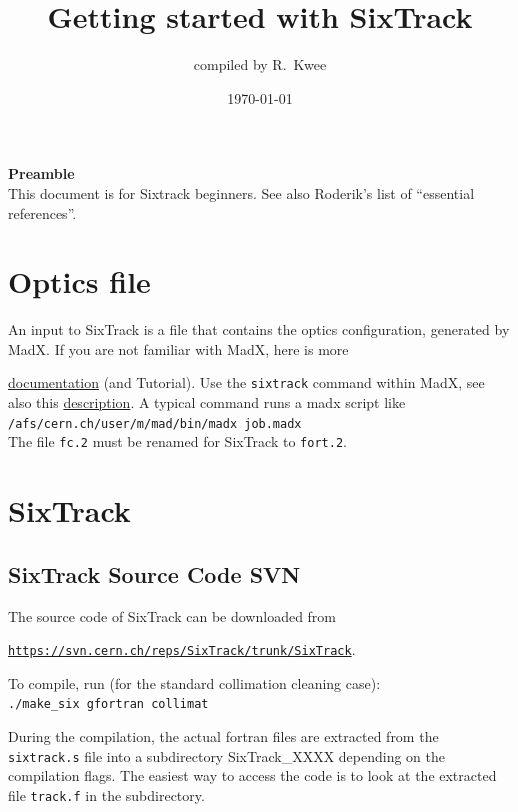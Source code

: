 \documentclass[a4paper, oneside, final]{scrartcl}
\begin{document}
\title{Getting started with SixTrack}
\author{\large{compiled by R.~Kwee}}

\date{\large{\today}}
        \maketitle


\setlength{\parindent}{0cm}
{\LARGE{\textbf{Preamble}}}\\

\noindent This document is for Sixtrack beginners. See also Roderik's list of ``essential references''.
\section{Optics file}

An input to SixTrack is a file that contains the optics configuration, generated by MadX. If you are not familiar with MadX, here is more {\href{http://mad.web.cern.ch/mad/www/documentation.html}{documentation} (and Tutorial). Use the \texttt{sixtrack} command within MadX, see also this {\href{http://frs.home.cern.ch/frs/Xdoc/c6t/c6t.html}{description}}. A typical command runs a madx script like\\

\texttt{/afs/cern.ch/user/m/mad/bin/madx job.madx}\\

The file \texttt{fc.2} must be renamed for SixTrack to \texttt{fort.2}. 

\section{SixTrack}

\subsection{SixTrack Source Code SVN}

The source code of SixTrack can be downloaded from\\ {\href{https://svn.cern.ch/reps/SixTrack/trunk/SixTrack}{\texttt{https://svn.cern.ch/reps/SixTrack/trunk/SixTrack}}. \newline

To compile, run (for the standard collimation cleaning case):\\
\texttt{./make\_six gfortran collimat}\newline

During the compilation, the actual fortran files are extracted from the \texttt{sixtrack.s} file into a subdirectory SixTrack\_XXXX depending on the compilation flags. The easiest way to access the code is to look at the extracted file \texttt{track.f} in the subdirectory. 

}}
\end{document}
